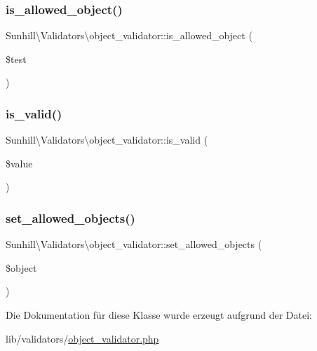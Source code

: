 \subsubsection{\texorpdfstring{is\+\_\+allowed\+\_\+object()}{is\_allowed\_object()}}
{\footnotesize\ttfamily Sunhill\textbackslash{}\+Validators\textbackslash{}object\+\_\+validator\+::is\+\_\+allowed\+\_\+object (\begin{DoxyParamCaption}\item[{}]{\$test }\end{DoxyParamCaption})\hspace{0.3cm}{\ttfamily [protected]}}

\mbox{\label{classSunhill_1_1Validators_1_1object__validator_a27d2216c25c6f60479af58c86dfec109}} 
\subsubsection{\texorpdfstring{is\+\_\+valid()}{is\_valid()}}
{\footnotesize\ttfamily Sunhill\textbackslash{}\+Validators\textbackslash{}object\+\_\+validator\+::is\+\_\+valid (\begin{DoxyParamCaption}\item[{}]{\$value }\end{DoxyParamCaption})\hspace{0.3cm}{\ttfamily [protected]}}

\mbox{\label{classSunhill_1_1Validators_1_1object__validator_abf68d28d2cd57c903b193e593a5c5ccf}} 
\subsubsection{\texorpdfstring{set\+\_\+allowed\+\_\+objects()}{set\_allowed\_objects()}}
{\footnotesize\ttfamily Sunhill\textbackslash{}\+Validators\textbackslash{}object\+\_\+validator\+::set\+\_\+allowed\+\_\+objects (\begin{DoxyParamCaption}\item[{}]{\$object }\end{DoxyParamCaption})}



Die Dokumentation für diese Klasse wurde erzeugt aufgrund der Datei\+:\begin{DoxyCompactItemize}
\item 
lib/validators/\hyperlink{object__validator_8php}{object\+\_\+validator.\+php}\end{DoxyCompactItemize}
